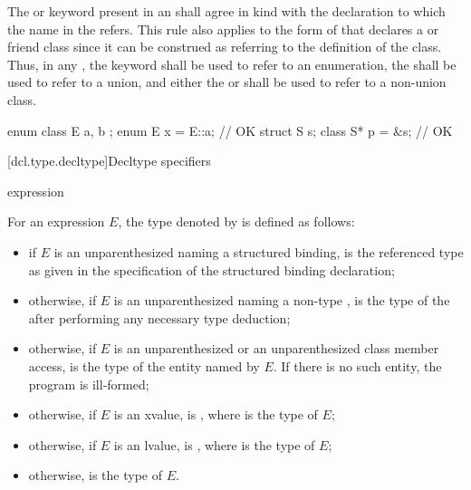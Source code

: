 \pnum
The  or  keyword
present in an
 shall agree in kind with the
declaration to which the name in the
 refers. This rule also applies to
the form of  that declares a
 or friend class since it can be construed
as referring to the definition of the class. Thus, in any
, the  keyword
shall be
used to refer to an enumeration, the 
 shall be used to refer to a union,
and either the  or 
 shall be used to refer to a non-union class.
\begin{example}
\begin{codeblock}
enum class E { a, b };
enum E x = E::a;                // OK
struct S { } s;
class S* p = &s;                // OK
\end{codeblock}
\end{example}

[dcl.type.decltype]{Decltype specifiers}%
%

\begin{bnf}
\br
   \terminal{(} expression \terminal{)}
\end{bnf}

\pnum
{}%
For an expression $E$, the type denoted by  is defined as follows:
\begin{itemize}
\item if $E$ is an unparenthesized 
naming a structured binding,
 is the referenced type as given in
the specification of the structured binding declaration;

\item otherwise, if $E$ is an unparenthesized 
naming a non-type ,
 is the type of the 
after performing any necessary
type deduction;

\item otherwise, if $E$ is an unparenthesized  or
an unparenthesized
class
member access,  is the
type of the entity named by $E$.
If there is no such entity, the program is ill-formed;

\item otherwise, if $E$ is
an xvalue,  is , where  is the type
of $E$;

\item otherwise, if $E$ is an lvalue, 
is , where  is the type of $E$;

\item otherwise,  is the type of $E$.
\end{itemize}

